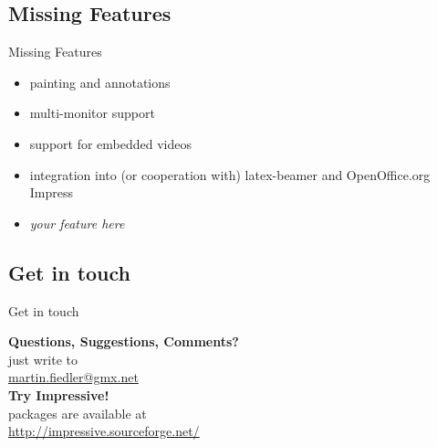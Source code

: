 \documentclass[bigger,hyperref={colorlinks=true,linkcolor=white,urlcolor=blue}]{beamer}
\begin{document}
\subsection{Missing Features}
\begin{frame}{Missing Features}
    \begin{itemize}
        \item painting and annotations
        \item multi-monitor support
        \item support for embedded videos
        \item integration into (or cooperation with) latex-beamer
              and OpenOffice.org Impress
        \item \alert{\emph{your feature here}}
    \end{itemize}
\end{frame}

\subsection{Get in touch}
\begin{frame}{Get in touch}
\begin{center}
    \textbf{Questions, Suggestions, Comments?} \\
    just write to \\
    \href{mailto:martin.fiedler@gmx.net}{martin.fiedler@gmx.net}
    \vspace{1.5cm} \\
    \textbf{Try Impressive!} \\
    packages are available at \\
    \href{http://impressive.sourceforge.net/}{http://impressive.sourceforge.net/}
\end{center}
\end{frame}
\end{document}
